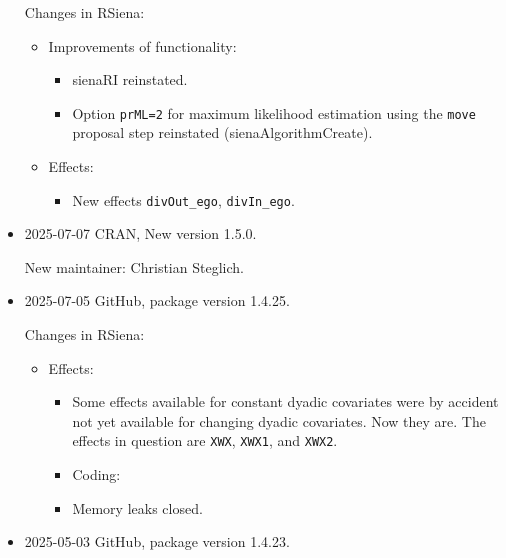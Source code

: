 \documentclass[a4paper,fleqn,11pt]{article}
\newcommand{\+}{\, + \,}
\newcommand{\sfn}[1]{\textsf{#1}}
\begin{document}
\begin{small}
\begin{itemize}
Changes in RSiena:
\begin{itemize}
\item Improvements of functionality:
   \begin{itemize}
   \item \sfn{sienaRI} reinstated.
  \item Option \texttt{prML=2} for maximum likelihood estimation
    using the \texttt{move} proposal step reinstated (\sfn{sienaAlgorithmCreate}).
    \end{itemize}
\item Effects:
   \begin{itemize}
   \item New effects \texttt{divOut\_ego}, \texttt{divIn\_ego}.
    \end{itemize}
\end{itemize}

\item 2025-07-07 CRAN, New version 1.5.0.

New maintainer: Christian Steglich.

\item 2025-07-05 GitHub, package version 1.4.25.

Changes in RSiena:
\begin{itemize}
 \item Effects:
 \begin{itemize}
  \item Some effects available for constant dyadic covariates were by
    accident not yet available for changing dyadic covariates.
    Now they are. The effects in question are
    \texttt{XWX}, \texttt{XWX1}, and \texttt{XWX2}.
 \item Coding:
  \item Memory leaks closed.
 \end{itemize}
\end{itemize}

\item 2025-05-03 GitHub, package version 1.4.23.


\end{itemize}
\end{small}
\end{document}
